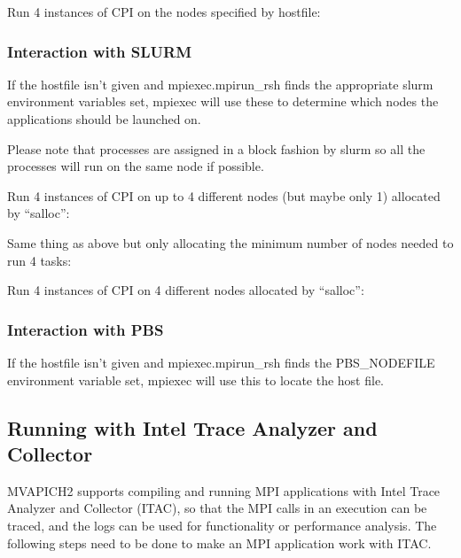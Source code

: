 
\noindent Run 4 instances of CPI on the nodes specified by hostfile:


\subsubsection{Interaction with SLURM}
If the hostfile isn't given and mpiexec.mpirun\_rsh finds the appropriate slurm
environment variables set, mpiexec will use these to determine which nodes the
applications should be launched on.

Please note that processes are assigned in a block fashion by slurm so all the processes will run on the same node if possible.

\noindent Run 4 instances of CPI on up to 4 different nodes (but maybe only 1)
allocated by ``salloc'':


\noindent Same thing as above but only allocating the minimum number of nodes
needed to run 4 tasks:


\noindent Run 4 instances of CPI on 4 different nodes allocated by ``salloc'':


\subsubsection{Interaction with PBS}
If the hostfile isn't given and mpiexec.mpirun\_rsh finds the PBS\_NODEFILE
environment variable set, mpiexec will use this to locate the host file.

\subsection{Running with Intel Trace Analyzer and Collector}

MVAPICH2 supports compiling and running MPI applications with Intel Trace Analyzer and Collector (ITAC), so that the MPI calls in an execution can be traced, and the logs can be used for functionality or performance analysis. The following steps need to be done to make an MPI application work with ITAC.

